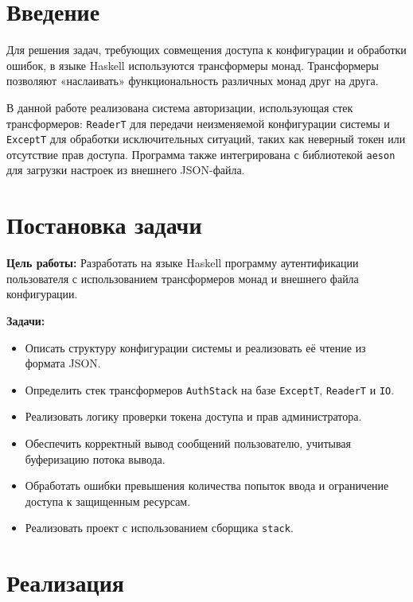 \documentclass[a4paper, final]{article}
\begin{document}
	\newpage
	
	\tableofcontents
	
	\newpage
	\section*{Введение}
	
	Для решения задач, требующих совмещения доступа к конфигурации и обработки ошибок, в языке Haskell используются трансформеры монад. Трансформеры позволяют «наслаивать» функциональность различных монад друг на друга.
	
	В данной работе реализована система авторизации, использующая стек трансформеров: \texttt{ReaderT} для передачи неизменяемой конфигурации системы и \texttt{ExceptT} для обработки исключительных ситуаций, таких как неверный токен или отсутствие прав доступа. Программа также интегрирована с библиотекой \texttt{aeson} для загрузки настроек из внешнего JSON-файла.
	
	
	
	\newpage
	\section*{Постановка задачи}
	\par \textbf{Цель работы:} Разработать на языке Haskell программу аутентификации пользователя с использованием трансформеров монад и внешнего файла конфигурации.
	\par \textbf{Задачи:}
	\begin{itemize}
		\item Описать структуру конфигурации системы и реализовать её чтение из формата JSON.
		\item Определить стек трансформеров \texttt{AuthStack} на базе \texttt{ExceptT}, \texttt{ReaderT} и \texttt{IO}.
		\item Реализовать логику проверки токена доступа и прав администратора.
		\item Обеспечить корректный вывод сообщений пользователю, учитывая буферизацию потока вывода.
		\item Обработать ошибки превышения количества попыток ввода и ограничение доступа к защищенным ресурсам.
		\item Реализовать проект с использованием сборщика \texttt{stack}.
	\end{itemize}
	
	\newpage
	\section{Реализация}
	
\end{document}
